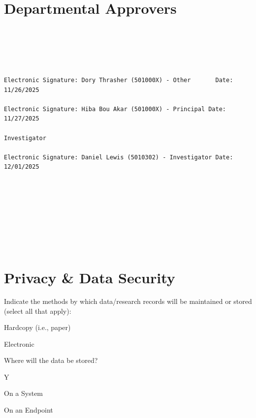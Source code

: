 \documentclass[10pt, letterpaper]{article}
\begin{document}
\section*{Departmental Approvers}

{\footnotesize

\begin{verbatim}





Electronic Signature: Dory Thrasher (501000X) - Other       Date: 11/26/2025

Electronic Signature: Hiba Bou Akar (501000X) - Principal Date: 11/27/2025

Investigator

Electronic Signature: Daniel Lewis (5010302) - Investigator Date: 12/01/2025









\end{verbatim}

}

\section*{Privacy \& Data Security}

\vspace{0.5em}

Indicate the methods by which data/research records will be maintained or stored (select all that apply):

\noindent \makebox[0pt][l]{$\square$}\hspace{1.2em}Hardcopy (i.e., paper)

\noindent \makebox[0pt][l]{\color{columbiablue_official}$\boxtimes$}\hspace{1.2em}Electronic

\begin{responsebox}

Where will the data be stored?

Y

\end{responsebox}

\noindent \makebox[0pt][l]{\color{columbiablue_official}$\boxtimes$}\hspace{1.2em}On a System

\noindent \makebox[0pt][l]{\color{columbiablue_official}$\boxtimes$}\hspace{1.2em}On an Endpoint
\end{document}
